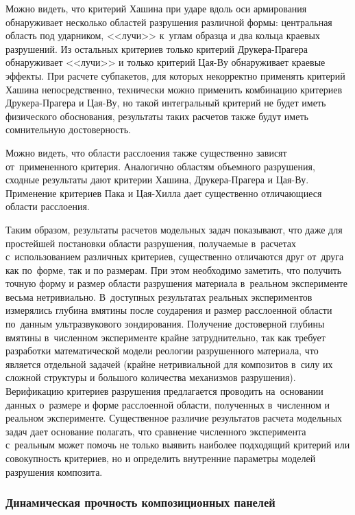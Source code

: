 \documentclass[thesis.tex]{subfiles}
\begin{document}
Можно видеть, что критерий Хашина при ударе вдоль оси армирования обнаруживает несколько областей разрушения различной
формы: центральная область под ударником, <<лучи>> к~углам образца и два кольца краевых разрушений. Из остальных
критериев только критерий Друкера-Прагера обнаруживает <<лучи>> и только критерий Цая-Ву обнаруживает краевые эффекты.
При расчете субпакетов, для которых некорректно применять критерий Хашина непосредственно, технически можно применить
комбинацию критериев Друкера-Прагера и Цая-Ву, но такой интегральный критерий не будет иметь физического обоснования,
результаты таких расчетов также будут иметь сомнительную достоверность.

Можно видеть, что области расслоения также существенно зависят от~примененного критерия. Аналогично областям объемного
разрушения, сходные результаты дают критерии Хашина, Друкера-Прагера и Цая-Ву. Применение критериев Пака и Цая-Хилла
дает существенно отличающиеся области расслоения.

Таким образом, результаты расчетов модельных задач показывают, что даже для простейшей постановки области разрушения,
получаемые в~расчетах с~использованием различных критериев, существенно отличаются друг от~друга как по~форме, так и по
размерам. При этом необходимо заметить, что получить точную форму и размер области разрушения материала в~реальном
эксперименте весьма нетривиально. В~доступных результатах реальных экспериментов измерялись глубина вмятины
после соударения и размер расслоенной области по~данным ультразвукового зондирования. Получение достоверной глубины
вмятины в~численном эксперименте крайне затруднительно, так как требует разработки математической модели реологии
разрушенного материала, что является отдельной задачей (крайне нетривиальной для композитов в~силу их сложной структуры
и большого количества механизмов разрушения). Верификацию критериев разрушения предлагается проводить на~основании
данных о~размере и форме расслоенной области, полученных в~численном и реальном эксперименте. Существенное различие
результатов расчета модельных задач дает основание полагать, что сравнение численного эксперимента с~реальным может
помочь не только выявить наиболее подходящий критерий или совокупность критериев, но и определить внутренние параметры
моделей разрушения композита.

\subsubsection{Динамическая прочность композиционных панелей}
\end{document}
